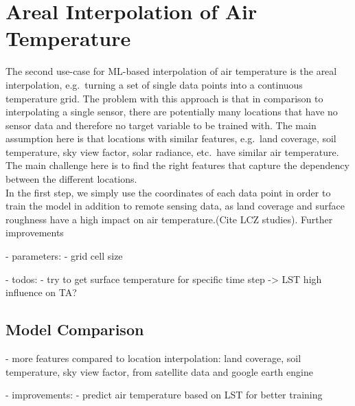 


\section{Areal Interpolation of Air Temperature}

The second use-case for ML-based interpolation of air temperature is the areal interpolation, e.g.\ turning a set of single data points into a continuous temperature grid. The problem with this approach is that in comparison to interpolating a single sensor, there are potentially many locations that have no sensor data and therefore no target variable to be trained with. The main assumption here is that locations with similar features, e.g.\ land coverage, soil temperature, sky view factor, solar radiance, etc.\ have similar air temperature. The main challenge here is to find the right features that capture the dependency between the different locations.\\
In the first step, we simply use the coordinates of each data point in order to train the model in addition to remote sensing data, as land coverage and surface roughness have a high impact on air temperature.(Cite LCZ studies).
Further improvements

- parameters:
  - grid cell size

- todos:
  - try to get surface temperature for specific time step -> LST high influence on TA?

\subsection{Model Comparison}

- more features compared to location interpolation: land coverage, soil temperature, sky view factor, from satellite data and google earth engine

- improvements:
  - predict air temperature based on LST for better training

